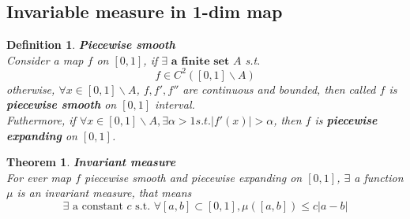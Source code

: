 \documentclass[12pt]{article}
\theoremstyle{plain}
\newtheorem{theorem}{\textbf{Theorem}}[section]
\newtheorem{definition}{{\color{red}\textbf{Definition}}}[section]
\begin{document}
\newpage
\subsection{Invariable measure in 1-dim map}
\begin{definition}\textbf{Piecewise smooth}
\\\noindent Consider a map $f$ on $[0, 1]$, if $\exists \textbf{ a finite set } A$ s.t.
$$
f \in C^2([0, 1]\backslash A)
$$
otherwise, $\forall x \in [0, 1]\backslash A$, $f, f', f''$ are continuous and bounded, then called $f$ is \textbf{piecewise smooth} on $[0, 1]$ interval.
\\\noindent Futhermore, if $\forall x \in [0, 1] \backslash A, \exists \alpha > 1 s.t. |f'(x)| > \alpha$, then $f$ is \textbf{piecewise expanding} on $[0, 1]$.
\end{definition}



\begin{theorem}\textbf{Invariant measure}
\\\noindent For ever map $f$ piecewise smooth and piecewise expanding on $[0, 1]$, $\exists $ a function $\mu$ is an invariant measure, that means
$$
\exists \text{ a constant } c \text{ s.t. } \forall [a, b]\subset [0, 1], \mu([a, b]) \leq c|a - b|
$$
\end{theorem}
\end{document}

